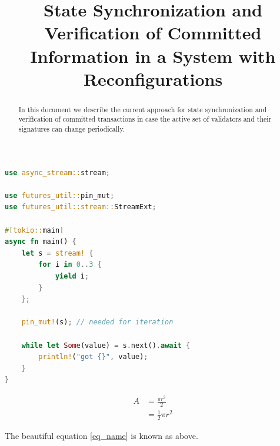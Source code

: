 \documentclass[letterpaper,10pt]{article}
\begin{document}
\title{State Synchronization and Verification of Committed Information in a System with Reconfigurations}
\author{}
\date{}
\maketitle

\begin{abstract}
In this document we describe the current approach for state synchronization and verification of committed transactions in case the active set of validators and their signatures can change periodically.
\end{abstract}

\begin{lstlisting}[language=Rust, caption=Rust example]
use async_stream::stream;

use futures_util::pin_mut;
use futures_util::stream::StreamExt;

#[tokio::main]
async fn main() {
    let s = stream! {
        for i in 0..3 {
            yield i;
        }
    };

    pin_mut!(s); // needed for iteration

    while let Some(value) = s.next().await {
        println!("got {}", value);
    }
}
\end{lstlisting}

\begin{equation} \label{eq_name}
\begin{split}
A & = \frac{\pi r^2}{2} \\
 & = \frac{1}{2} \pi r^2
\end{split}
\end{equation}

The beautiful equation \ref{eq_name} is known as above.


\hskip 5pt
\end{document}

